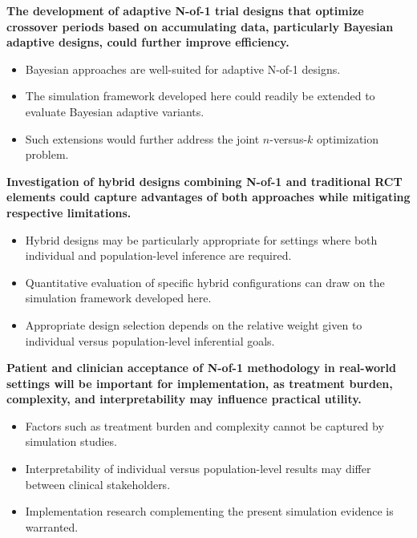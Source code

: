 \documentclass[
  11pt,
]{article}
\begin{document}
\textbf{The development of adaptive N-of-1 trial designs that optimize crossover periods based on accumulating data, particularly Bayesian adaptive designs, could further improve efficiency.}

\begin{itemize}\setlength{\itemsep}{2pt}\setlength{\parskip}{0pt}
\item Bayesian approaches are well-suited for adaptive N-of-1 designs.
\item The simulation framework developed here could readily be extended to evaluate Bayesian adaptive variants.
\item Such extensions would further address the joint $n$-versus-$k$ optimization problem.
\end{itemize}

\textbf{Investigation of hybrid designs combining N-of-1 and traditional RCT elements could capture advantages of both approaches while mitigating respective limitations.}

\begin{itemize}\setlength{\itemsep}{2pt}\setlength{\parskip}{0pt}
\item Hybrid designs may be particularly appropriate for settings where both individual and population-level inference are required.
\item Quantitative evaluation of specific hybrid configurations can draw on the simulation framework developed here.
\item Appropriate design selection depends on the relative weight given to individual versus population-level inferential goals.
\end{itemize}

\textbf{Patient and clinician acceptance of N-of-1 methodology in real-world settings will be important for implementation, as treatment burden, complexity, and interpretability may influence practical utility.}

\begin{itemize}\setlength{\itemsep}{2pt}\setlength{\parskip}{0pt}
\item Factors such as treatment burden and complexity cannot be captured by simulation studies.
\item Interpretability of individual versus population-level results may differ between clinical stakeholders.
\item Implementation research complementing the present simulation evidence is warranted.
\end{itemize}
\end{document}
